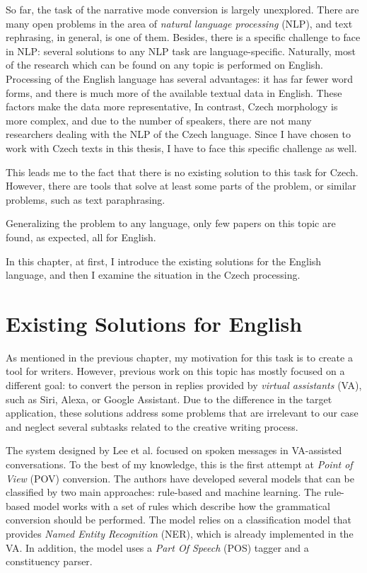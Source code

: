So far, the task of the narrative mode conversion is largely unexplored. There are many open problems in the area of \emph{natural language processing} (NLP), and text rephrasing, in general, is one of them. Besides, there is a specific challenge to face in NLP: several solutions to any NLP task are language-specific. Naturally, most of the research which can be found on any topic is performed on English. Processing of the English language has several advantages: it has far fewer word forms, and there is much more of the available textual data in English. These factors make the data more representative, In contrast, Czech morphology is more complex, and due to the number of speakers, there are not many researchers dealing with the NLP  of the Czech language. Since I have chosen to work with Czech texts in this thesis, I have to face this specific challenge as well.

This leads me to the fact that there is no existing solution to this task for Czech. However, there are tools that solve at least some parts of the problem, or similar problems, such as text paraphrasing.

Generalizing the problem to any language, only few papers on this topic are found, as expected, all for English.

In this chapter, at first, I introduce the existing solutions for the English language, and then I examine the situation in the Czech processing.

\section{Existing Solutions for English}

As mentioned in the previous chapter, my motivation for this task is to create a tool for writers. However, previous work on this topic has mostly focused on a different goal: to convert the person in replies provided by \emph{virtual assistants} (VA), such as Siri, Alexa, or Google Assistant. Due to the difference in the target application, these solutions address some problems that are irrelevant to our case and neglect several subtasks related to the creative writing process.

The system designed by Lee et al. \cite{lee2020converting} focused on spoken messages in VA-assisted conversations. To the best of my knowledge, this is the first attempt at \emph{Point of View} (POV) conversion. The authors have developed several models that can be classified by two main approaches: rule-based and machine learning. The rule-based model works with a set of rules which describe how the grammatical conversion should be performed. The model relies on a classification model that provides \emph{Named Entity Recognition} (NER), which is already implemented in the VA. In addition, the model uses a \emph{Part Of Speech} (POS) tagger and a constituency parser.

